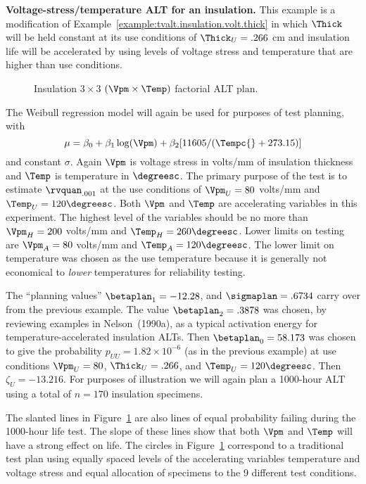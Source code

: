 \begin{example}
\label{example:tvalt.insulation.volt.temp}
{\bf Voltage-stress/temperature ALT for an insulation.} 
This example is a modification of
Example~\ref{example:tvalt.insulation.volt.thick} in which $\Thick$
will be held constant at its use conditions of $\Thick_{U}=.266$ cm  and
insulation life will be accelerated by using levels of voltage stress and 
temperature that are  higher than use conditions.
\begin{figure}
\caption{Insulation  $3 \times 3$ $ (\Vpm \times \Temp)$ factorial ALT plan.}
\label{figure:insul.vpm.temp.factorial.ps}
\end{figure}
The Weibull regression model will again be used for purposes of test
planning, with
\begin{displaymath}
\mu=\beta_{0} + \beta_{1} \log(\Vpm) + \beta_{2} [11605/(\Tempc{}+273.15)]
\end{displaymath}
and constant $\sigma$. Again $\Vpm$ is voltage stress in volts/mm of
insulation thickness and $\Temp$ is temperature in $\degreesc$.  The
primary purpose of the test is to estimate $\rvquan_{.001}$ at the
use conditions of $\Vpm_{U}=80$ volts/mm and
$\Temp_{U}=120 \degreesc$.  Both $\Vpm$ and $\Temp$ are accelerating
variables in this experiment.  The highest level of the variables should
be no more than $\Vpm_{H}=200$ volts/mm and $\Temp_{H}=260 \degreesc$. Lower
limits on testing are $\Vpm_{A}=80$ volts/mm and $\Temp_{A}=120 \degreesc$.
The lower limit on temperature was chosen as the use temperature
because it is generally not economical to {\em lower} temperatures for
reliability testing.

The ``planning values'' $\betaplan_{1}=-12.28$, and $\sigmaplan=.6734$ carry
over from the previous example.  The value $\betaplan_{2}=.3878$ was
chosen, by reviewing examples in Nelson~(1990a), as a typical
activation energy for temperature-accelerated insulation ALTs.  Then
$\betaplan_{0}=58.173$ was chosen to give the probability $p_{UU}=1.82
\times 10^{-6}$ (as in the previous 
example) at use conditions $\Vpm_{U}=80$, $\Thick_{U}=.266$, and 
$\Temp_{U}=120\degreesc$. Then $\zeta_{U}=-13.216$.
For purposes of illustration we will again plan a 1000-hour ALT using
a total of $n=170$ insulation specimens.

The slanted lines in Figure~\ref{figure:insul.vpm.temp.factorial.ps}
are also lines of equal probability failing during the 1000-hour
life test.  The slope of these lines show that both $\Vpm$ and
$\Temp$ will have a strong effect on life.  The circles in
Figure~\ref{figure:insul.vpm.temp.factorial.ps} correspond to a
traditional test plan using equally spaced levels of the
accelerating variables temperature and voltage stress and equal
allocation of specimens to the 9 different test conditions.
\end{example}

